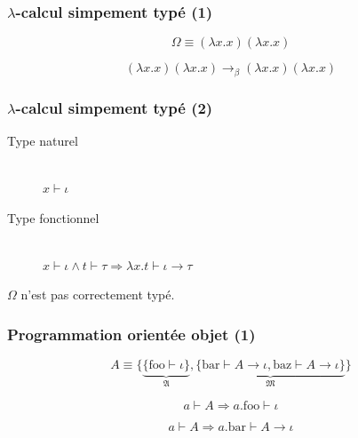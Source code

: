 \documentclass[14pt,utf8x,hyperref={pdfpagelabels=false}]{beamer}
\begin{document}
\begin{slideDecision}
  \begin{changeleftmargin}{1.1cm}
    \frametitle{$\lambda$-calcul simpement typé (1)}

    \begin{equation*}
      \Omega \equiv (\lambda x . x) (\lambda x . x)
    \end{equation*}

    \begin{equation*}
      (\lambda x . x) (\lambda x . x) \rightarrow_\beta
      (\lambda x . x) (\lambda x . x)
    \end{equation*}
  \end{changeleftmargin}
\end{slideDecision}

\begin{slideDecision}
  \begin{changeleftmargin}{1.1cm}
    \frametitle{$\lambda$-calcul simpement typé (2)}

    \begin{description}
    \item[Type naturel]~\\
      $x \vdash \iota$
    \item[Type fonctionnel]~\\
      $x \vdash \iota \wedge t \vdash \tau \Rightarrow \lambda x. t \vdash \iota \rightarrow \tau$
    \end{description}

    \bigskip

    $\Omega$ n'est pas correctement typé.

  \end{changeleftmargin}
\end{slideDecision}

\begin{slideDecision}
  \begin{changeleftmargin}{1.1cm}
    \frametitle{Programmation orientée objet (1)}

    \begin{equation*}
      A \equiv \{ \underbrace{\{ \text{foo} \vdash \iota
        \}}_{\mathfrak{A}}, \underbrace{\{ \text{bar} \vdash A
        \rightarrow \iota, \text{baz} \vdash A \rightarrow \iota
        \}}_{\mathfrak{M}} \}
    \end{equation*}

    \begin{equation*}
      a \vdash A \Rightarrow a.\text{foo} \vdash \iota
    \end{equation*}

    \begin{equation*}
      a \vdash A \Rightarrow a.\text{bar} \vdash A \rightarrow \iota
    \end{equation*}
  \end{changeleftmargin}
\end{slideDecision}
\end{document}
